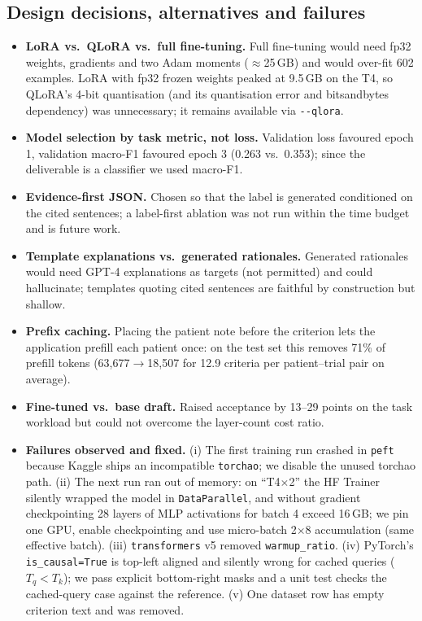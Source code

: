 \documentclass[conference]{IEEEtran}
\begin{document}
\subsection{Design decisions, alternatives and failures}\label{sec:decisions}
\begin{itemize}
\item \textbf{LoRA vs.\ QLoRA vs.\ full fine-tuning.} Full fine-tuning would need fp32 weights, gradients and two Adam moments ($\approx$25\,GB) and would over-fit 602 examples. LoRA with fp32 frozen weights peaked at 9.5\,GB on the T4, so QLoRA's 4-bit quantisation (and its quantisation error and bitsandbytes dependency) was unnecessary; it remains available via \verb!--qlora!.
\item \textbf{Model selection by task metric, not loss.} Validation loss favoured epoch 1, validation macro-F1 favoured epoch 3 (0.263 vs.\ 0.353); since the deliverable is a classifier we used macro-F1.
\item \textbf{Evidence-first JSON.} Chosen so that the label is generated conditioned on the cited sentences; a label-first ablation was not run within the time budget and is future work.
\item \textbf{Template explanations vs.\ generated rationales.} Generated rationales would need GPT-4 explanations as targets (not permitted) and could hallucinate; templates quoting cited sentences are faithful by construction but shallow.
\item \textbf{Prefix caching.} Placing the patient note before the criterion lets the application prefill each patient once: on the test set this removes 71\% of prefill tokens (63{,}677$\rightarrow$18{,}507 for 12.9 criteria per patient--trial pair on average).
\item \textbf{Fine-tuned vs.\ base draft.} Raised acceptance by 13--29 points on the task workload but could not overcome the layer-count cost ratio.
\item \textbf{Failures observed and fixed.} (i) The first training run crashed in \texttt{peft} because Kaggle ships an incompatible \texttt{torchao}; we disable the unused torchao path. (ii) The next run ran out of memory: on ``T4$\times$2'' the HF Trainer silently wrapped the model in \texttt{DataParallel}, and without gradient checkpointing 28 layers of MLP activations for batch 4 exceed 16\,GB; we pin one GPU, enable checkpointing and use micro-batch 2$\times$8 accumulation (same effective batch). (iii) \texttt{transformers} v5 removed \texttt{warmup\_ratio}. (iv) PyTorch's \texttt{is\_causal=True} is top-left aligned and silently wrong for cached queries ($T_q{<}T_k$); we pass explicit bottom-right masks and a unit test checks the cached-query case against the reference. (v) One dataset row has empty criterion text and was removed.
\end{itemize}
\end{document}
